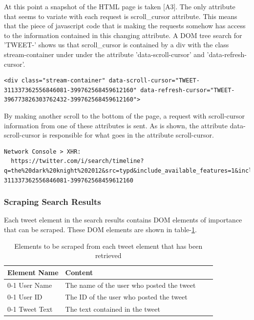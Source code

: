 At this point a snapshot of the HTML page is taken [A3]. The only attribute that seems to variate with each request is scroll\_cursor attribute. This means that the piece of javascript code that is making the requests somehow has access to the information contained in this changing attribute. A DOM tree search for 'TWEET-' shows us that scroll\_cursor is contained by a div with the class stream-container under under the attribute 'data-scroll-cursor' and 'data-refresh-cursor'.

  \begin{lstlisting}[caption={TODO: Caption},label={},captionpos=b]
  <div class="stream-container" data-scroll-cursor="TWEET-311337362556846081-399762568459612160" data-refresh-cursor="TWEET-396773826303762432-399762568459612160">
  \end{lstlisting}

By making another scroll to the bottom of the page, a request with scroll-cursor information from one of these attributes is sent.
As is shown, the attribute data-scroll-cursor is responsible for what goes in the attribute scroll-cursor.

  \begin{lstlisting}[caption={TODO: Caption},label={},captionpos=b]
  Network Console > XHR:
  https://twitter.com/i/search/timeline?q=the%20dark%20knight%202012&src=typd&include_available_features=1&include_entities=1&last_note_ts=0&scroll_cursor=TWEET-311337362556846081-399762568459612160
  \end{lstlisting}

\subsubsection{Scraping Search Results}

Each tweet element in the search results contains DOM elements of importance that can be scraped. These DOM elements are shown in table-\ref{table:important-tweet-element-elements}.

\begin{table}[H]
\centering
\begin{tabularx}{5.3\textwidth}{ lp{7cm} lp{5cm} }
  \textbf{Element Name} & \textbf{Content}\\
  \cline{0-1}
  User Name & The name of the user who posted the tweet \\
  \cline{0-1}
  User ID & The ID of the user who posted the tweet \\
  \cline{0-1}
  Tweet Text & The text contained in the tweet
\end{tabularx}
\caption{Elements to be scraped from each tweet element that has been retrieved}
\label{table:important-tweet-element-elements}
\end{table}

